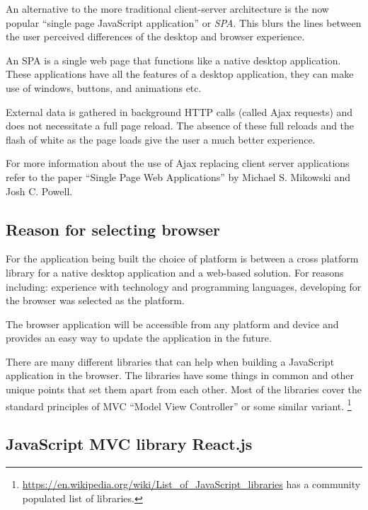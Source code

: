 An alternative to the more traditional client-server architecture is the
now popular ``single page JavaScript application'' or \emph{SPA}. This blurs the
lines between the user perceived differences of the desktop and browser
experience.

An SPA is a single web page that functions like a native desktop
application. These applications have all the features of a desktop application,
they can make use of windows, buttons, and animations etc.

External data is gathered in background HTTP calls (called Ajax
requests) and does not necessitate a full page reload. The absence of
these full reloads and the flash of white as the page loads give the
user a much better experience.

For more information about the use of Ajax replacing client server applications
refer to the paper ``Single Page Web Applications'' by Michael S. Mikowski and Josh C.
Powell\cite{garrett2005ajax}.

\subsection{Reason for selecting browser}\label{reason-for-selecting-browser}

For the application being built the choice of platform is between a
cross platform library for a native desktop application and a web-based
solution. For reasons including: experience with technology and programming
languages, developing for the browser was selected as the platform.

The browser application will be accessible from any platform and device
and provides an easy way to update the application in the future.

There are many different libraries that can help when building a JavaScript
application in the browser. The libraries have some things in common and other
unique points that set them apart from each other. Most of the libraries cover
the standard principles of MVC ``Model View Controller'' or some similar
variant. \footnote{
\href{https://en.wikipedia.org/wiki/List_of_JavaScript_libraries\#Web-application_related_.28MVC.2C_MVVM.29}%
{https://en.wikipedia.org/wiki/List\_of\_JavaScript\_libraries}
has a community populated list of libraries.}

\subsection{JavaScript MVC library React.js}\label{javascript-mvc-library-react.js}

